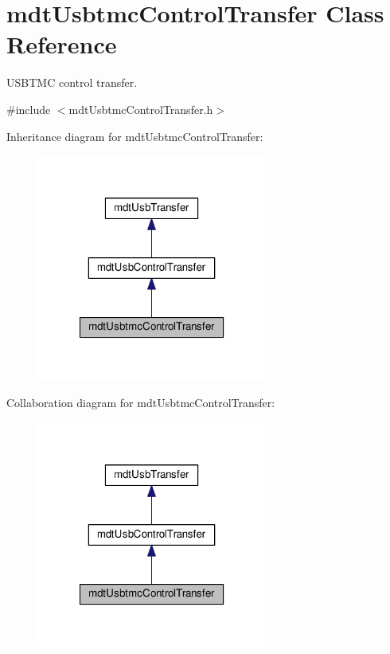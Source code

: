 \hypertarget{classmdt_usbtmc_control_transfer}{\section{mdt\-Usbtmc\-Control\-Transfer Class Reference}
\label{classmdt_usbtmc_control_transfer}
}


U\-S\-B\-T\-M\-C control transfer.  




{\ttfamily \#include $<$mdt\-Usbtmc\-Control\-Transfer.\-h$>$}



Inheritance diagram for mdt\-Usbtmc\-Control\-Transfer\-:
\nopagebreak
\begin{figure}[H]
\begin{center}
\leavevmode
\includegraphics[width=214pt]{classmdt_usbtmc_control_transfer__inherit__graph}
\end{center}
\end{figure}


Collaboration diagram for mdt\-Usbtmc\-Control\-Transfer\-:
\nopagebreak
\begin{figure}[H]
\begin{center}
\leavevmode
\includegraphics[width=214pt]{classmdt_usbtmc_control_transfer__coll__graph}
\end{center}
\end{figure}
